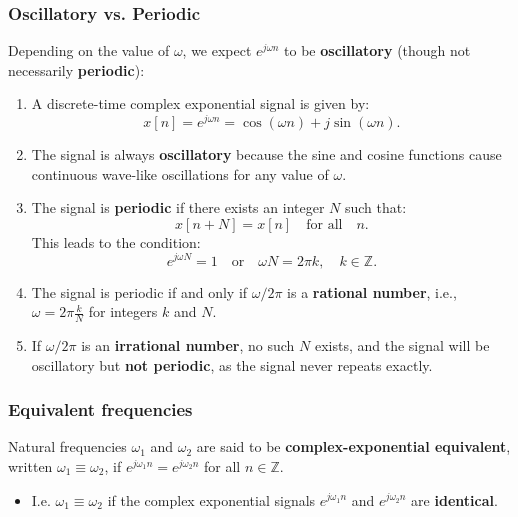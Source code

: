     \subsubsection{Oscillatory vs. Periodic}
    \begin{intuition}
        Depending on the value of \(\omega\), we expect \(e^{j\omega n}\) to be \textbf{oscillatory} (though not necessarily \textbf{periodic}):
        \begin{enumerate}
            \item A discrete-time complex exponential signal is given by:
            \[
            x[n] = e^{j\omega n} = \cos(\omega n) + j \sin(\omega n).
            \]
            
            \item The signal is always \textbf{oscillatory} because the sine and cosine functions cause continuous wave-like oscillations for any value of \(\omega\).
            
            \item The signal is \textbf{periodic} if there exists an integer \(N\) such that:
            \[
            x[n + N] = x[n] \quad \text{for all} \quad n.
            \]
            This leads to the condition:
            \[
            e^{j\omega N} = 1 \quad \text{or} \quad \omega N = 2\pi k, \quad k \in \mathbb{Z}.
            \]
            
            \item The signal is periodic if and only if \(\omega / 2\pi\) is a \textbf{rational number}, i.e., \(\omega = 2\pi \frac{k}{N}\) for integers \(k\) and \(N\).
            
            \item If \(\omega / 2\pi\) is an \textbf{irrational number}, no such \(N\) exists, and the signal will be oscillatory but \textbf{not periodic}, as the signal never repeats exactly.
            
        \end{enumerate}        
    \end{intuition}

    \subsubsection{Equivalent frequencies}
    \begin{definition}
    Natural frequencies \(\omega_1\) and \(\omega_2\) are said to be \textbf{complex-exponential equivalent}, written \(\omega_1 \equiv \omega_2\), if \(e^{j\omega_1 n} = e^{j\omega_2 n}\) for all \(n \in \mathbb{Z}\). 
    \begin{itemize}
        \item I.e. \(\omega_1 \equiv \omega_2\) if the complex exponential signals \(e^{j\omega_1 n}\) and \(e^{j\omega_2 n}\) are \textbf{identical}.
    \end{itemize}
    \end{definition}
    
